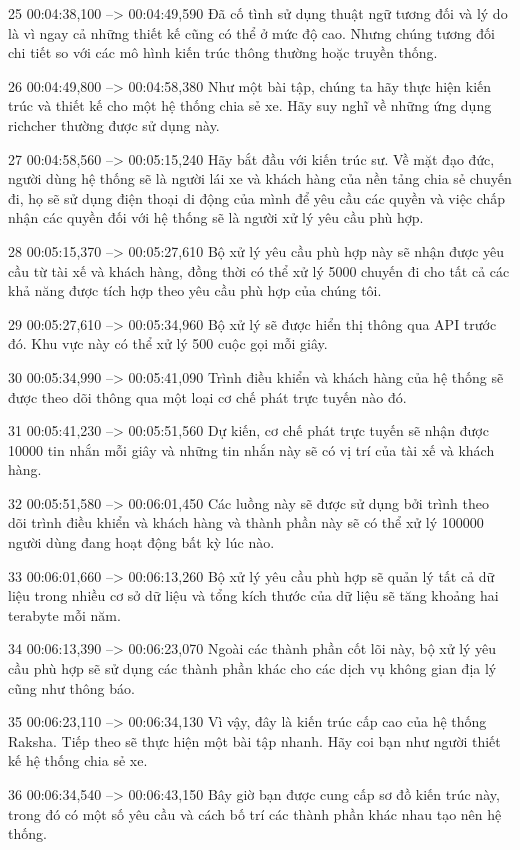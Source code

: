 25
00:04:38,100 --> 00:04:49,590
Đã cố tình sử dụng thuật ngữ tương đối và lý do là vì ngay cả những thiết kế cũng có thể ở mức độ cao.  Nhưng chúng tương đối chi tiết so với các mô hình kiến ​​trúc thông thường hoặc truyền thống.

26
00:04:49,800 --> 00:04:58,380
Như một bài tập, chúng ta hãy thực hiện kiến ​​trúc và thiết kế cho một hệ thống chia sẻ xe.  Hãy suy nghĩ về những ứng dụng richcher thường được sử dụng này.

27
00:04:58,560 --> 00:05:15,240
Hãy bắt đầu với kiến ​​trúc sư.  Về mặt đạo đức, người dùng hệ thống sẽ là người lái xe và khách hàng của nền tảng chia sẻ chuyến đi, họ sẽ sử dụng điện thoại di động của mình để yêu cầu các quyền và việc chấp nhận các quyền đối với hệ thống sẽ là người xử lý yêu cầu phù hợp.

28
00:05:15,370 --> 00:05:27,610
Bộ xử lý yêu cầu phù hợp này sẽ nhận được yêu cầu từ tài xế và khách hàng, đồng thời có thể xử lý 5000 chuyến đi cho tất cả các khả năng được tích hợp theo yêu cầu phù hợp của chúng tôi.

29
00:05:27,610 --> 00:05:34,960
Bộ xử lý sẽ được hiển thị thông qua API trước đó.  Khu vực này có thể xử lý 500 cuộc gọi mỗi giây.

30
00:05:34,990 --> 00:05:41,090
Trình điều khiển và khách hàng của hệ thống sẽ được theo dõi thông qua một loại cơ chế phát trực tuyến nào đó.

31
00:05:41,230 --> 00:05:51,560
Dự kiến, cơ chế phát trực tuyến sẽ nhận được 10000 tin nhắn mỗi giây và những tin nhắn này sẽ có vị trí của tài xế và khách hàng.

32
00:05:51,580 --> 00:06:01,450
Các luồng này sẽ được sử dụng bởi trình theo dõi trình điều khiển và khách hàng và thành phần này sẽ có thể xử lý 100000 người dùng đang hoạt động bất kỳ lúc nào.

33
00:06:01,660 --> 00:06:13,260
Bộ xử lý yêu cầu phù hợp sẽ quản lý tất cả dữ liệu trong nhiều cơ sở dữ liệu và tổng kích thước của dữ liệu sẽ tăng khoảng hai terabyte mỗi năm.

34
00:06:13,390 --> 00:06:23,070
Ngoài các thành phần cốt lõi này, bộ xử lý yêu cầu phù hợp sẽ sử dụng các thành phần khác cho các dịch vụ không gian địa lý cũng như thông báo.

35
00:06:23,110 --> 00:06:34,130
Vì vậy, đây là kiến ​​trúc cấp cao của hệ thống Raksha.  Tiếp theo sẽ thực hiện một bài tập nhanh.  Hãy coi bạn như người thiết kế hệ thống chia sẻ xe.

36
00:06:34,540 --> 00:06:43,150
Bây giờ bạn được cung cấp sơ đồ kiến ​​trúc này, trong đó có một số yêu cầu và cách bố trí các thành phần khác nhau tạo nên hệ thống.

